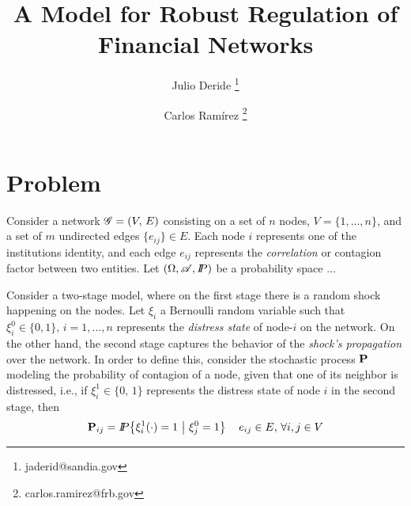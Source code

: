 \documentclass[12pt,letterpaper]{article}
\title{A Model for Robust Regulation of Financial Networks}
\author[1]{Julio Deride \thanks{jaderid@sandia.gov}}
\author[2]{Carlos Ram\'irez \thanks{carlos.ramirez@frb.gov}}
\affil[1]{Sandia National Laboratories, USA}
\affil[2]{Federal Reserve Board, USA}
\begin{document}
\maketitle
\baselineskip=15pt

\begin{abstract}

\end{abstract}

\section{Problem}
Consider a network ${\mathscr G}=(V,\,E)$ consisting on a set of $n$ nodes, $V=\{1,\ldots,n\}$, and a set of $m$ undirected edges $\{e_{ij}\}\in E$. Each node $i$ represents one of the institutions identity, and each edge $e_{ij}$ represents the \emph{correlation} or contagion factor between two entities. Let $(\Omega,{\mathscr A},{I\kern-.35em P})$ be a probability space ...


Consider a two-stage model, where on the first stage there is a random shock happening on the nodes.   Let $\xi_i$ a Bernoulli random variable such that $\xi^0_i\in\{0,1\},\,i=1,\ldots,n$ represents the \emph{distress state} of node-$i$ on the network.  On the other hand, the second stage captures the behavior of the \emph{shock's propagation} over the network.  In order to define this, consider the stochastic process ${\bf P}$ modeling the probability of contagion of a node, given that one of its neighbor is distressed, i.e., if $\xi^1_i\in\{0,\,1\}$ represents the distress state of node $i$ in the second stage, then
\[{\bf P}_{ij}={I\kern-.35em P}\big\lbrace \xi^1_i(\cdot)=1\,{\,\big\vert\,}\,\xi^0_j=1\big\rbrace\,\quad e_{ij}\in E,\,\forall i,j\in V\]
\end{document}
